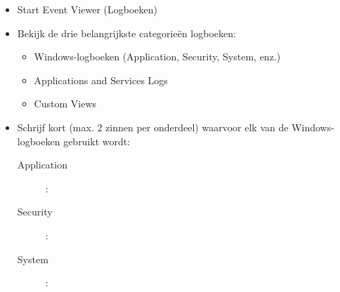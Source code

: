\begin{itemize}
\item Start Event Viewer (Logboeken)
\item Bekijk de drie belangrijkste categorieën logboeken:
    \begin{itemize}
    \item Windows-logboeken (Application, Security, System, enz.)
    \item Applications and Services Logs
    \item Custom Views
    \end{itemize}
\item Schrijf kort (max. 2 zinnen per onderdeel) waarvoor elk van de Windows-logboeken gebruikt wordt:
	\begin{description}
	\item[Application] :  \newline \newline
	\item[Security] : \newline \newline
	\item[System] : \newline \newline
	\end{description}
\end{itemize}

